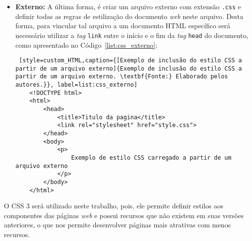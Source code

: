 \begin{itemize}
	\item \textbf{Externo:} A última forma, é criar um arquivo externo com extensão \texttt{.css} e definir todas as regras de estilização do documento \textit{web} neste arquivo. Desta forma, para vincular tal arquivo a um documento HTML específico será necessário utilizar a \textit{tag} \texttt{link} entre o início e o fim da \textit{tag} \texttt{head} do documento, como apresentado no Código~\ref{list:css_externo};
	
	\begin{lstlisting} [style=custom_HTML,caption={[Exemplo de inclusão do estilo CSS a partir de um arquivo externo]{Exemplo de inclusão do estilo CSS a partir de um arquivo externo. \textbf{Fonte:} Elaborado pelos autores.}}, label=list:css_externo] 	
	<!DOCTYPE html>
	<html>
		<head>
			<title>Titulo da pagina</title>
			<link rel="stylesheet" href="style.css">
		</head>
		<body>
			<p>
				Exemplo de estilo CSS carregado a partir de um arquivo externo
			</p>
		</body>
	</html>
	\end{lstlisting}
	
	
\end{itemize}

O CSS 3 será utilizado neste trabalho, pois, ele permite definir estilos aos componentes das páginas \textit{web} e possui recursos que não existem em suas versões anteriores, o que nos permite desenvolver páginas mais atrativas com menos recursos.